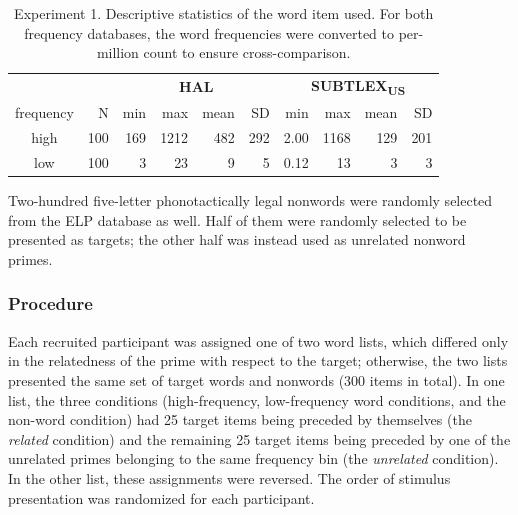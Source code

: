 \documentclass[
]{interact}
\begin{document}
\begin{longtable}{crrrrrrrrr}

\caption{\label{tbl-words_exp1}Experiment 1. Descriptive statistics of
the word item used. For both frequency databases, the word frequencies
were converted to per-million count to ensure cross-comparison.}

\tabularnewline

\toprule
 &  & \multicolumn{4}{c}{\textbf{HAL}} & \multicolumn{4}{c}{\textbf{SUBTLEX\textsubscript{US}}} \\ 
\cmidrule(lr){3-6} \cmidrule(lr){7-10}
frequency & N & min & max & mean & SD & min & max & mean & SD \\ 
\midrule\addlinespace[2.5pt]
high & 100 & 169 & 1212 & 482 & 292 & 2.00 & 1168 & 129 & 201 \\ 
low & 100 & 3 & 23 & 9 & 5 & 0.12 & 13 & 3 & 3 \\ 
\bottomrule

\end{longtable}

Two-hundred five-letter phonotactically legal nonwords were randomly
selected from the ELP database as well. Half of them were randomly
selected to be presented as targets; the other half was instead used as
unrelated nonword primes.

\subsubsection{Procedure}\label{sec-exp1-methods-proc}

Each recruited participant was assigned one of two word lists, which
differed only in the relatedness of the prime with respect to the
target; otherwise, the two lists presented the same set of target words
and nonwords (300 items in total). In one list, the three conditions
(high-frequency, low-frequency word conditions, and the non-word
condition) had 25 target items being preceded by themselves (the
\emph{related} condition) and the remaining 25 target items being
preceded by one of the unrelated primes belonging to the same frequency
bin (the \emph{unrelated} condition). In the other list, these
assignments were reversed. The order of stimulus presentation was
randomized for each participant.
\end{document}
